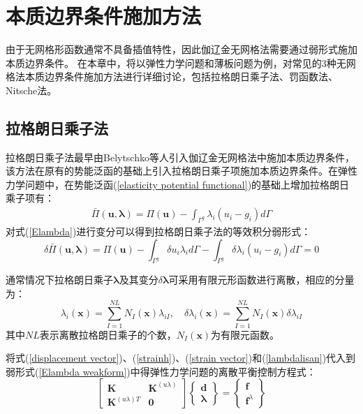\chapter{本质边界条件施加方法}
由于无网格形函数通常不具备插值特性，因此伽辽金无网格法需要通过弱形式施加本质边界条件。
在本章中，将以弹性力学问题和薄板问题为例，对常见的3种无网格法本质边界条件施加方法进行详细讨论，包括拉格朗日乘子法、罚函数法、Nitsche法。
\section{拉格朗日乘子法}
拉格朗日乘子法最早由Belytschko等人\cite{}引入伽辽金无网格法中施加本质边界条件，该方法在原有的势能泛函的基础上引入拉格朗日乘子项施加本质边界条件。在弹性力学问题中，在势能泛函(\ref{elasticity potential functional})的基础上增加拉格朗日乘子项有：
\begin{equation}\label{Elambda}
\begin{split}
    \bar{\Pi}(\pmb{u},\pmb \lambda)=\Pi(\pmb{u})-\int_{\Gamma^g}\lambda_i(u_i-g_i)d\Gamma
\end{split}
\end{equation}   
对式(\ref{Elambda})进行变分可以得到拉格朗日乘子法的等效积分弱形式：
\begin{equation}\label{Elambda weakform}
        \delta\bar{\Pi}(\pmb{u},\pmb{\lambda})=\Pi(\pmb{u})-\int_{\Gamma^g}\delta u_i\lambda_id\Gamma-\int_{\Gamma^g}\delta\lambda_i(u_i-g_i)d\Gamma=0
\end{equation}\par
通常情况下拉格朗日乘子$\pmb{\lambda}$及其变分$\delta\pmb{\lambda}$可采用有限元形函数进行离散，相应的分量为：
\begin{equation}\label{lambdalisan}
\lambda_i(\pmb{x})=\sum_{I=1}^{N\!L}N_I(\pmb{x})\lambda_{iI},\quad
\delta\lambda_i(\pmb{x})=\sum_{I=1}^{N\!L}N_I(\pmb{x})\delta\lambda_{iI}
\end{equation}
其中$N\!L$表示离散拉格朗日乘子的个数，$N_I(\pmb{x})$为有限元函数。\par
将式(\ref{displacement vector})、(\ref{strainh})、(\ref{strain vector})和(\ref{lambdalisan})代入到弱形式(\ref{Elambda weakform})中得弹性力学问题的离散平衡控制方程式：
\begin{equation}
    \begin{bmatrix}\pmb{K}&\pmb{K}^{(u\lambda)}\\\pmb{K}^{(u\lambda) T}&\pmb{0}\end{bmatrix}
    \left\{\begin{matrix}\pmb{d}\\\pmb{\lambda}\end{matrix}\right\}=
    \left\{\begin{matrix}\pmb{f}\\\pmb{f}^{\lambda}\end{matrix}\right\}
\end{equation}
